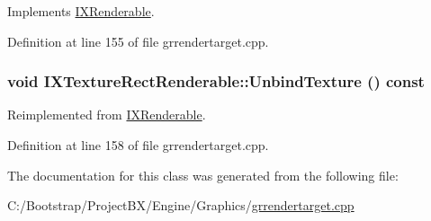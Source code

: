 Implements \hyperlink{class_i_x_renderable_aa7a8918c305cc562df3f3f44cd761d7}{IXRenderable}.

Definition at line 155 of file grrendertarget.cpp.\hypertarget{class_i_x_texture_rect_renderable_fd7cf5412255a00c33d84c17a22cbefa}{
\subsubsection[{UnbindTexture}]{\setlength{\rightskip}{0pt plus 5cm}void IXTextureRectRenderable::UnbindTexture () const}}
\label{class_i_x_texture_rect_renderable_fd7cf5412255a00c33d84c17a22cbefa}




Reimplemented from \hyperlink{class_i_x_renderable_a6c88c0ccc0cc869114309de6843f5ac}{IXRenderable}.

Definition at line 158 of file grrendertarget.cpp.

The documentation for this class was generated from the following file:\begin{CompactItemize}
\item 
C:/Bootstrap/ProjectBX/Engine/Graphics/\hyperlink{grrendertarget_8cpp}{grrendertarget.cpp}\end{CompactItemize}
